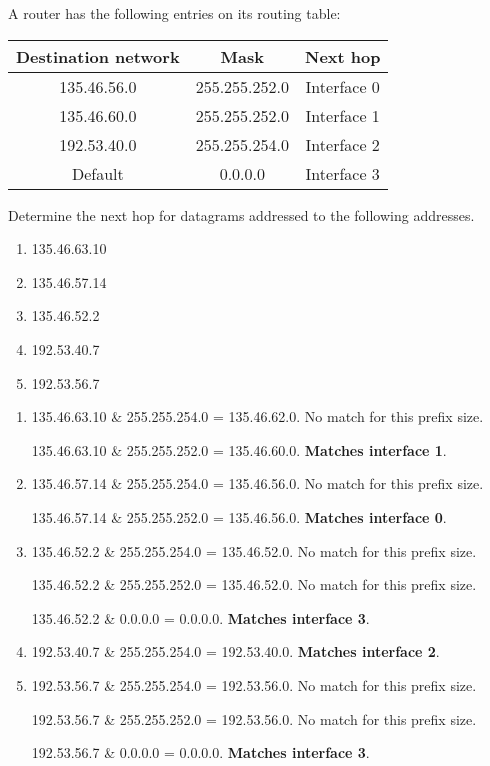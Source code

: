 \begin{Exercise}
A router has the following entries on its routing table:

\begin{center}
\begin{tabular}{c|c|c}
    Destination network & Mask          & Next hop    \\ \hline
            135.46.56.0 & 255.255.252.0 & Interface 0 \\ \hline
            135.46.60.0 & 255.255.252.0 & Interface 1 \\ \hline
            192.53.40.0 & 255.255.254.0 & Interface 2 \\ \hline
            Default     &       0.0.0.0 & Interface 3
\end{tabular}
\end{center}

Determine the next hop for datagrams addressed to the following addresses.

\begin{enumerate}
\item 135.46.63.10
\item 135.46.57.14
\item 135.46.52.2
\item 192.53.40.7
\item 192.53.56.7
\end{enumerate}
\end{Exercise}
\begin{Answer}
\begin{enumerate}
\item 135.46.63.10 \& 255.255.254.0 = 135.46.62.0. No match for this prefix size.

135.46.63.10 \& 255.255.252.0 = 135.46.60.0. \textbf{Matches interface 1}.

\item 135.46.57.14 \& 255.255.254.0 = 135.46.56.0. No match for this prefix size.

135.46.57.14 \& 255.255.252.0 = 135.46.56.0. \textbf{Matches interface 0}.

\item 135.46.52.2 \& 255.255.254.0 = 135.46.52.0. No match for this prefix size.

135.46.52.2 \& 255.255.252.0 = 135.46.52.0. No match for this prefix size.

135.46.52.2 \& 0.0.0.0 = 0.0.0.0. \textbf{Matches interface 3}.

\item 192.53.40.7 \& 255.255.254.0 = 192.53.40.0. \textbf{Matches interface 2}.

\item 192.53.56.7 \& 255.255.254.0 = 192.53.56.0. No match for this prefix size.

192.53.56.7 \& 255.255.252.0 = 192.53.56.0. No match for this prefix size.

192.53.56.7 \& 0.0.0.0 = 0.0.0.0. \textbf{Matches interface 3}.
\end{enumerate}
\end{Answer}

